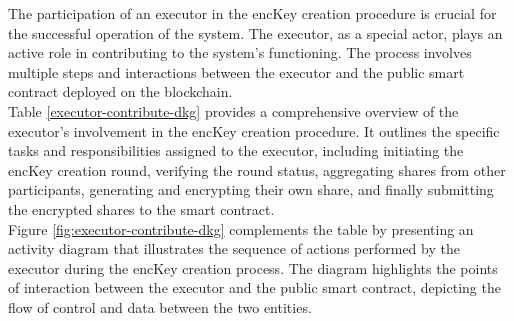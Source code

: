 \documentclass[../Main.tex]{subfiles}
\begin{document}
The participation of an executor in the encKey creation procedure is crucial for the successful operation of the system. The executor, as a special actor, plays an active role in contributing to the system's functioning. The process involves multiple steps and interactions between the executor and the public smart contract deployed on the blockchain.\\
\indent Table \ref{executor-contribute-dkg} provides a comprehensive overview of the executor's involvement in the encKey creation procedure. It outlines the specific tasks and responsibilities assigned to the executor, including initiating the encKey creation round, verifying the round status, aggregating shares from other participants, generating and encrypting their own share, and finally submitting the encrypted shares to the smart contract.\\
\indent Figure \ref{fig:executor-contribute-dkg} complements the table by presenting an activity diagram that illustrates the sequence of actions performed by the executor during the encKey creation process. The diagram highlights the points of interaction between the executor and the public smart contract, depicting the flow of control and data between the two entities.
\end{document}
